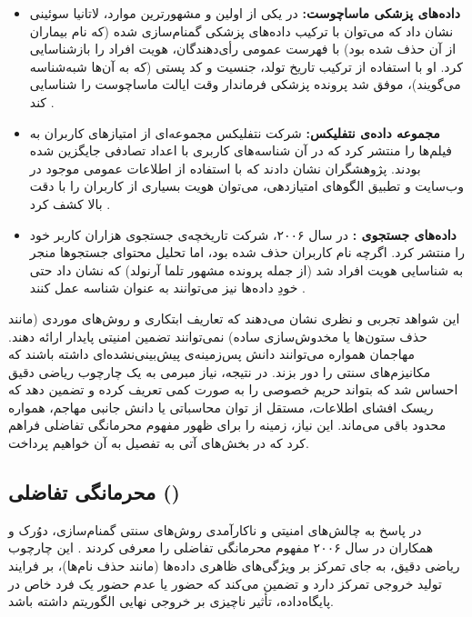 \begin{itemize}
  \item \textbf{داده‌های پزشکی ماساچوست:}
  در یکی از اولین و مشهورترین موارد، لاتانیا سوئینی نشان داد که می‌توان با ترکیب داده‌های پزشکی گمنام‌سازی شده (که نام بیماران از آن حذف شده بود) با فهرست عمومی رأی‌دهندگان، هویت افراد را بازشناسایی کرد.
  او با استفاده از ترکیب تاریخ تولد، جنسیت و کد پستی (که به آن‌ها شبه‌شناسه می‌گویند)، موفق شد پرونده پزشکی فرماندار وقت ایالت ماساچوست را شناسایی کند \cite{sweeney2002k}.

  \item \textbf{مجموعه داده‌ی نتفلیکس:}
  شرکت نتفلیکس مجموعه‌ای از امتیازهای کاربران به فیلم‌ها را منتشر کرد که در آن شناسه‌های کاربری با اعداد تصادفی جایگزین شده بودند.
  پژوهشگران نشان دادند که با استفاده از اطلاعات عمومی موجود در وب‌سایت  و تطبیق الگوهای امتیازدهی، می‌توان هویت بسیاری از کاربران را با دقت بالا کشف کرد \cite{narayanan2008robust}.

  \item \textbf{داده‌های جستجوی :}
  در سال ۲۰۰۶، شرکت  تاریخچه‌ی جستجوی هزاران کاربر خود را منتشر کرد.
  اگرچه نام کاربران حذف شده بود، اما تحلیل محتوای جستجوها منجر به شناسایی هویت افراد شد (از جمله پرونده مشهور تلما آرنولد) که نشان داد حتی خودِ داده‌ها نیز می‌توانند به عنوان شناسه عمل کنند \cite{barbaro2006face}.
\end{itemize}

این شواهد تجربی و نظری نشان می‌دهند که تعاریف ابتکاری و روش‌های موردی (مانند حذف ستون‌ها یا مخدوش‌سازی ساده) نمی‌توانند تضمین امنیتی پایدار ارائه دهند.
مهاجمان همواره می‌توانند دانش پس‌زمینه‌ی پیش‌بینی‌نشده‌ای داشته باشند که مکانیزم‌های سنتی را دور بزند.
در نتیجه، نیاز مبرمی به یک چارچوب ریاضی دقیق احساس شد که بتواند حریم خصوصی را به صورت کمی تعریف کرده و تضمین دهد که ریسک افشای اطلاعات، مستقل از توان محاسباتی یا دانش جانبی مهاجم، همواره محدود باقی می‌ماند.
این نیاز، زمینه را برای ظهور مفهوم محرمانگی تفاضلی فراهم کرد که در بخش‌های آتی به تفصیل به آن خواهیم پرداخت.




\subsection{محرمانگی تفاضلی ()}
\label{sec:intro:cdp}

در پاسخ به چالش‌های امنیتی و ناکارآمدی روش‌های سنتی گمنام‌سازی، دوُرک و همکاران در سال ۲۰۰۶ مفهوم محرمانگی تفاضلی را معرفی کردند \cite{dwork2006differential}.
این چارچوب ریاضی دقیق، به جای تمرکز بر ویژگی‌های ظاهری داده‌ها (مانند حذف نام‌ها)، بر فرایند تولید خروجی تمرکز دارد و تضمین می‌کند که حضور یا عدم حضور یک فرد خاص در پایگاه‌داده، تأثیر ناچیزی بر خروجی نهایی الگوریتم داشته باشد.

